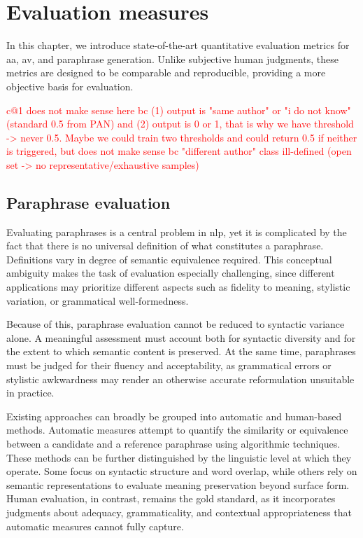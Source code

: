 \section{Evaluation measures}
\label{sec:evaluation_measures}

In this chapter, we introduce state-of-the-art quantitative evaluation metrics for \ac{aa}, \ac{av}, and paraphrase generation. 
Unlike subjective human judgments, these metrics are designed to be comparable and reproducible, providing a more objective basis for evaluation.

\textcolor{red}{
c@1 does not make sense here bc (1) output is "same author" or "i do not know" (standard 0.5 from PAN) and (2) output is 0 or 1, that is why we have threshold -> never 0.5. Maybe we could train two thresholds and could return 0.5 if neither is triggered, but does not make sense bc "different author" class ill-defined (open set -> no representative/exhaustive samples)
}



\subsection{Paraphrase evaluation}
\label{subsec:paraphrase_evaluation}

Evaluating paraphrases is a central problem in \ac{nlp}, yet it is complicated by the fact that there is no universal definition of what constitutes a paraphrase. 
Definitions vary in degree of semantic equivalence required. 
This conceptual ambiguity makes the task of evaluation especially challenging, since different applications may prioritize different aspects such as fidelity to meaning, stylistic variation, or grammatical well-formedness.

Because of this, paraphrase evaluation cannot be reduced to syntactic variance alone. 
A meaningful assessment must account both for syntactic diversity and for the extent to which semantic content is preserved. 
At the same time, paraphrases must be judged for their fluency and acceptability, as grammatical errors or stylistic awkwardness may render an otherwise accurate reformulation unsuitable in practice.

Existing approaches can broadly be grouped into automatic and human-based methods. 
Automatic measures attempt to quantify the similarity or equivalence between a candidate and a reference paraphrase using algorithmic techniques. 
These methods can be further distinguished by the linguistic level at which they operate. 
Some focus on syntactic structure and word overlap, while others rely on semantic representations to evaluate meaning preservation beyond surface form. 
Human evaluation, in contrast, remains the gold standard, as it incorporates judgments about adequacy, grammaticality, and contextual appropriateness that automatic measures cannot fully capture.

